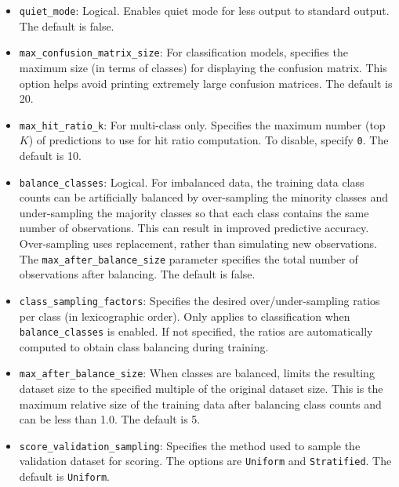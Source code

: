 {{\begin{itemize}
\item \texttt{quiet\_mode}: Logical. Enables quiet mode for less output to standard output. The default is false.

\item \texttt{max\_confusion\_matrix\_size}: For classification models, specifies the maximum size (in terms of classes) for displaying the confusion matrix. This option helps avoid printing extremely large confusion matrices. The default is 20.

\item \texttt{max\_hit\_ratio\_k}: For multi-class only. Specifies the maximum number (top $K$) of predictions to use for hit ratio computation. To disable, specify \texttt{0}. The default is 10.

\item \texttt{balance\_classes}: Logical. For imbalanced data, the training data class counts can be artificially balanced by over-sampling the minority classes and under-sampling the majority classes so that each class  contains the same number of observations.  This can result in improved predictive accuracy.  Over-sampling  uses replacement, rather than simulating new observations. The \texttt{max\_after\_balance\_size} parameter specifies the total number of observations after balancing. The default is false.

\item \texttt{class\_sampling\_factors}: Specifies the desired over/under-sampling ratios per class (in lexicographic order). Only applies to classification when \texttt{balance\_classes} is enabled. If not specified, the ratios are automatically computed to obtain class balancing during training.

\item \texttt{max\_after\_balance\_size}: When classes are balanced, limits the resulting dataset size to the specified multiple of the original dataset size. This is the maximum relative size of the training data after balancing class counts and can be less than 1.0. The default is 5.

\item \texttt{score\_validation\_sampling}: Specifies the method used to sample the validation dataset for scoring. The options are \texttt{Uniform} and \texttt{Stratified}. The default is \texttt{Uniform}.


\end{itemize}}}
